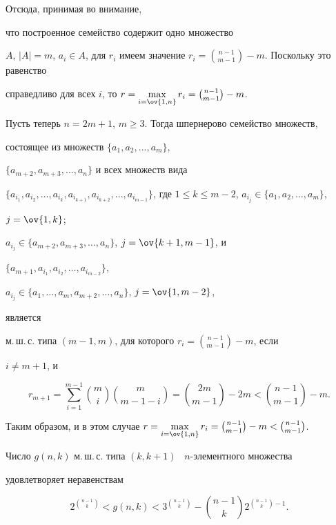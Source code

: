 Отсюда, принимая во внимание, 


что построенное семейство содержит одно множество 


$A$, $|A|=m$, $a_i\in A$, для $r_i$ имеем значение $r_i= 


\binom{n-1}{m-1}-m$. Поскольку это равенство 


справедливо для всех $i$, то $r=\max\limits_{i=\ov{1,n}}r_i= 


\binom{n-1}{m-1}-m$. 


 


Пусть теперь $n=2m+1$, $m\ge3$. Тогда шпернерово семейство множеств, 


состоящее из множеств $\{a_1,a_2,...,a_m\}$, 


$\{a_{m+2},a_{m+3},...,a_n\}$ и всех множеств вида 


$\{a_{i_1},a_{i_2},...,a_{i_k}, a_{i_{k+1}}, a_{i_{k+2}},..., 


a_{i_{m-1}}\}$, где $1\le k\le m-2$, $a_{i_j}\in\{a_1,a_2,\dotsc,a_m\}$, 


$j=\ov{1,k}$; 


$a_{i_j}\in\{a_{m+2},a_{m+3},\dotsc,a_n\}$, $j=\ov{k+1,m-1}$, и 


$\{a_{m+1},a_{i_1},a_{i_2},\dotsc,a_{i_{m-2}}\}$, 


$a_{i_j}\in\{a_1,\dotsc,a_m,a_{m+2},\dotsc,a_n\}$, $j=\ov{1,m-2}$, 


является 


м.\,ш.\,с. типа $(m-1,m)$, для которого $r_i=\binom{n-1}{m-1}-m$, если 


$i\ne m+1$, и 


$$ 


r_{m+1}=\sum_{i=1}^{m-1}\binom{m}{i}\binom{m}{m-1-i}= 


\binom{2m}{m-1}-2m<\binom{n-1}{m-1}-m. 


$$ 


Таким образом, и в этом случае $r=\max\limits_{i=\ov{1,n}}r_i= 


\binom{n-1}{m-1}-m<\binom{n-1}{m-1}$. 


 


 


\begin{thm} 


Число $g(n,k)$ м.\,ш.\,с. типа $(k,k+1)$ \ $n$-элементного множества 


удовлетворяет неравенствам 


$$ 


2^{\binom{n-1}{k}}<g(n,k)<3^{\binom{n-1}{k}}- 


\binom{n-1}{k}2^{\binom{n-1}{k}-1}. 


$$ 


\end{thm} 


